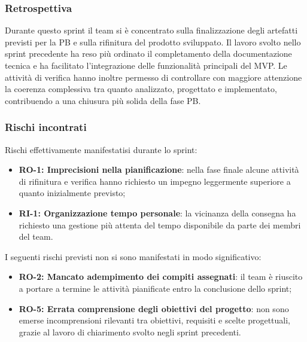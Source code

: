 \documentclass[a4paper,12pt]{article}
\begin{document}
        
       \subsubsection{Retrospettiva}{
            Durante questo sprint il team si è concentrato sulla finalizzazione degli artefatti previsti per la PB e sulla rifinitura del prodotto sviluppato. Il lavoro svolto nello sprint precedente ha reso più ordinato il completamento della documentazione tecnica e ha facilitato l'integrazione delle funzionalità principali del MVP. Le attività di verifica hanno inoltre permesso di controllare con maggiore attenzione la coerenza complessiva tra quanto analizzato, progettato e implementato, contribuendo a una chiusura più solida della fase PB.
        }

        \subsubsection{Rischi incontrati}{
            Rischi effettivamente manifestatisi durante lo sprint:
            \begin{itemize}
                \item \textbf{RO-1: Imprecisioni nella pianificazione}: nella fase finale alcune attività di rifinitura e verifica hanno richiesto un impegno leggermente superiore a quanto inizialmente previsto;
                \item \textbf{RI-1: Organizzazione tempo personale}: la vicinanza della consegna ha richiesto una gestione più attenta del tempo disponibile da parte dei membri del team.
            \end{itemize}

            I seguenti rischi previsti non si sono manifestati in modo significativo:
            \begin{itemize}
                \item \textbf{RO-2: Mancato adempimento dei compiti assegnati}: il team è riuscito a portare a termine le attività pianificate entro la conclusione dello sprint;
                \item \textbf{RO-5: Errata comprensione degli obiettivi del progetto}: non sono emerse incomprensioni rilevanti tra obiettivi, requisiti e scelte progettuali, grazie al lavoro di chiarimento svolto negli sprint precedenti.
            \end{itemize}
        }
\end{document}
